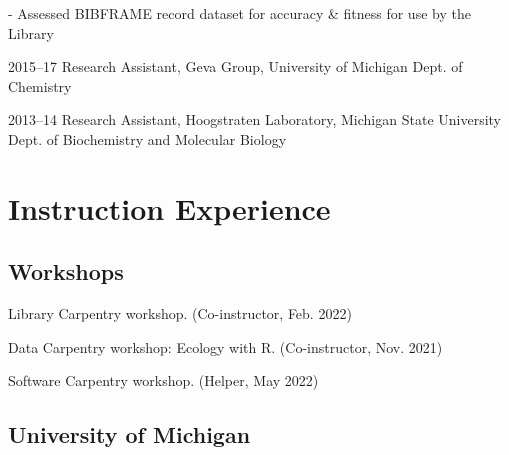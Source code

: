 \documentclass[12pt,letterpaper]{report}
\newcommand{\listitemspace}{0.25em}
\renewenvironment{itemize}
{\begin{list}{}{\setlength{\leftmargin}{0em}
            \setlength{\parskip}{0em}
            \setlength{\itemsep}{\listitemspace}
            \setlength{\parsep}{\listitemspace}}}
{\end{list}}
\begin{document}
\begin{tablist}
\begin{itemize}
\begin{footnotesize}
		\item - Assessed BIBFRAME record dataset for accuracy \& fitness for use by the Library
		
	\end{footnotesize} \end{itemize}

	\item[2015--17] \tab Research Assistant, Geva Group, University of Michigan Dept. of Chemistry
	
	\item[2013--14] \tab Research Assistant, Hoogstraten Laboratory, Michigan State University Dept. of Biochemistry and Molecular Biology

\end{tablist}



\section*{Instruction Experience}

\subsection*{Workshops}

\begin{itemize}

	\item Library Carpentry workshop. (Co-instructor, Feb. 2022)
	
	\item Data Carpentry workshop: Ecology with R. (Co-instructor, Nov. 2021)
	
	\item Software Carpentry workshop. (Helper, May 2022)

\end{itemize}

\subsection*{University of Michigan}
    
\end{document}
